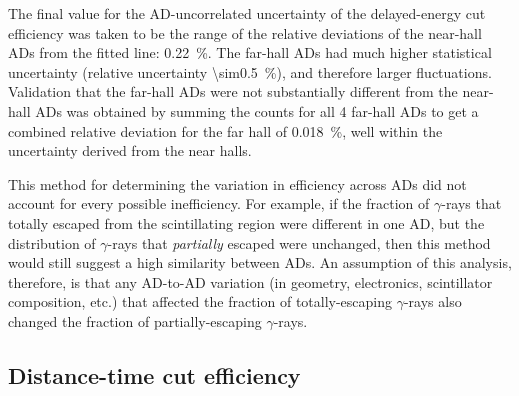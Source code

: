 The final value for the AD-uncorrelated uncertainty
of the delayed-energy cut efficiency was taken to be
the range of the relative deviations
of the near-hall ADs from the fitted line: \SI{0.22}{\percent}.
The far-hall ADs had much higher statistical uncertainty
(relative uncertainty \SI{\sim0.5}{\percent}),
and therefore larger fluctuations.
Validation that the far-hall ADs were not
substantially different from the near-hall ADs was obtained by
summing the counts for all 4 far-hall ADs to get
a combined relative deviation for the far hall of \SI{0.018}{\percent},
well within the uncertainty derived from the near halls.

This method for determining the variation in efficiency across ADs
did not account for every possible inefficiency.
For example, if the fraction of $\gamma$-rays that totally
escaped from the scintillating region were different in one AD,
but the distribution of $\gamma$-rays that \textit{partially} escaped were unchanged,
then this method would still suggest a high similarity between ADs.
An assumption of this analysis, therefore, is that any AD-to-AD variation
(in geometry, electronics, scintillator composition, etc.)
that affected the fraction of totally-escaping $\gamma$-rays
also changed the fraction of partially-escaping $\gamma$-rays.

\subsection{Distance-time cut efficiency}
\label{subsec:eff_DT}

